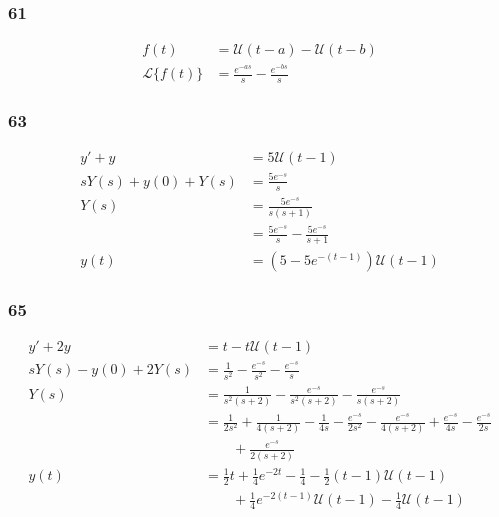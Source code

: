 \documentclass{article}
\begin{document}
\subsubsection{61}

\begin{align*}
  f(t)                & = \mathcal{U} (t - a) - \mathcal{U} (t - b) \\
  \mathcal{L}\{f(t)\} & = \frac{e^{-a s}}{s} - \frac{e^{-b s}}{s}
\end{align*}

\subsubsection{63}

\begin{align*}
  y' + y               & = 5 \mathcal{U} (t - 1)                       \\
  s Y(s) + y(0) + Y(s) & = \frac{5 e^{-s}}{s}                          \\
  Y(s)                 & = \frac{5 e^{-s}}{s (s + 1)}                  \\
                       & = \frac{5 e^{-s}}{s} - \frac{5 e^{-s}}{s + 1} \\
  y(t)                 & = (5 - 5 e^{-(t - 1)}) \mathcal{U} (t - 1)
\end{align*}

\subsubsection{65}

\begin{align*}
  y' + 2 y               & = t - t \mathcal{U} (t - 1)                                                                                                                         \\
  s Y(s) - y(0) + 2 Y(s) & = \frac{1}{s^2} - \frac{e^{-s}}{s^2} - \frac{e^{-s}}{s}                                                                                             \\
  Y(s)                   & = \frac{1}{s^2 (s + 2)} - \frac{e^{-s}}{s^2 (s + 2)} - \frac{e^{-s}}{s (s + 2)}                                                                     \\
                         & = \frac{1}{2 s^2} + \frac{1}{4 (s + 2)} - \frac{1}{4 s} - \frac{e^{-s}}{2 s^2} - \frac{e^{-s}}{4 (s + 2)} + \frac{e^{-s}}{4 s} - \frac{e^{-s}}{2 s} \\
                         & \qquad + \frac{e^{-s}}{2 (s + 2)}                                                                                                                   \\
  y(t)                   & = \frac{1}{2} t + \frac{1}{4} e^{-2 t} - \frac{1}{4} - \frac{1}{2} (t - 1) \mathcal{U}(t - 1)                                                       \\
                         & \qquad  + \frac{1}{4} e^{-2 (t - 1)} \mathcal{U}(t - 1) - \frac{1}{4} \mathcal{U}(t - 1)                                                            \\
\end{align*}
\end{document}
